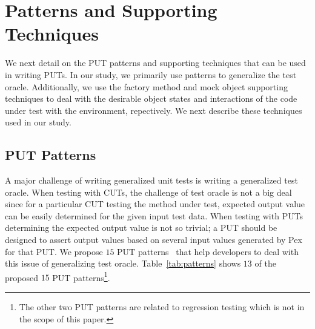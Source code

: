 \section{Patterns and Supporting Techniques}
\label{sec:helper}

We next detail on the PUT patterns and supporting techniques that can be used in writing PUTs. In our study, we primarily use patterns to generalize the test oracle. Additionally, we use the factory method and mock object supporting techniques to deal with the desirable object states and interactions of the code under test with the environment, repectively. We next describe these techniques used in our study.
\subsection{PUT Patterns}
\label{sec:patterns}

A major challenge of writing generalized unit tests is writing a generalized test oracle. When testing with CUTs, the challenge of test oracle is not a big deal since for a particular CUT testing the method under test, expected output value can be easily determined for the given input test data. When testing with PUTs determining the expected output value is not so trivial; a PUT should be designed to assert output values based on several input values generated by Pex for that PUT. We propose $15$ PUT patterns~\cite{halleux08:putpatterns} that help developers to deal with this issue of generalizing test oracle. Table~\ref{tab:patterns} shows $13$ of the proposed $15$ PUT patterns\footnote{The other two PUT patterns are related to regression testing which is not in the scope of this paper.}.

